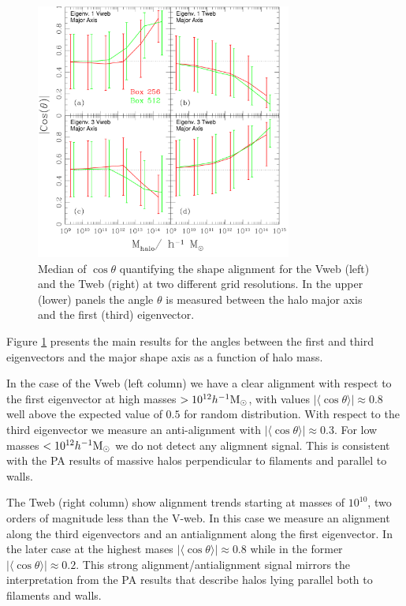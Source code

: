 \documentclass[useAMS,usenatbib]{mn2e}
\newcommand{\hMsun}{{\ifmmode{h^{-1}{\rm
        {M_{\odot}}}}\else{$h^{-1}{\rm{M_{\odot}}}$~}\fi}}
\newcommand{\muavg}{\vert\langle\cos\theta\rangle\vert}
\begin{document}
\begin{figure}
\includegraphics[width=0.75\textwidth]{Fig2.pdf}
\caption{Median of $\cos\theta$ quantifying the shape alignment for
  the Vweb (left) and the Tweb (right) at two different grid
  resolutions. In the upper (lower) panels the angle $\theta$ is
  measured between the halo major axis and the first (third)
  eigenvector.\label{fig:shape_alignment}} 
\end{figure}

Figure \ref{fig:shape_alignment} presents the main results for the
angles between the first and third eigenvectors and the major shape
axis as a function of halo mass. 

In the case of the Vweb (left column) we have a clear alignment with
respect to the first eigenvector at high masses $>10^{12}\hMsun$, with
values $\muavg\approx 0.8$ well above the expected value of $0.5$ for
random distribution. With respect to the third eigenvector we measure
an anti-alignment with $\muavg\approx0.3$. For low masses
$<10^{12}\hMsun$ we do not detect any aligmnent signal. This is 
consistent with the PA results of massive halos
perpendicular to filaments and parallel to walls.

The Tweb (right column) show alignment trends starting at masses of
$10^{10}$\hMsun, two orders of magnitude less than the V-web. In this
case we measure an alignment along the third eigenvectors and an
antialignment along the first eigenvector. In the later case at the
highest mases $\muavg\approx 0.8$ while in the former $\muavg\approx
0.2$. This strong alignment/antialignment signal mirrors the
interpretation from the PA results that describe halos lying parallel
both to filaments and walls.
\end{document}
